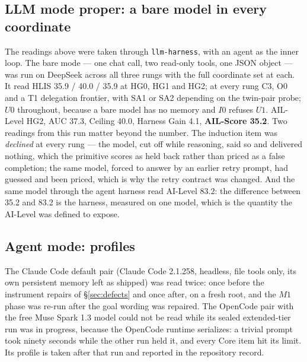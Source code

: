 \documentclass[11pt]{article}
\theoremstyle{definition}
\begin{document}
\subsection{LLM mode proper: a bare model in every coordinate}

The readings above were taken through \texttt{llm-harness}, with an agent as the inner loop. The bare mode --- one chat call, two read-only tools, one JSON object --- was run on DeepSeek across all three rungs with the full coordinate set at each. It read HLIS 35.9 / 40.0 / 35.9 at HG0, HG1 and HG2; at every rung C3, O0 and a T1 delegation frontier, with SA1 or SA2 depending on the twin-pair probe; $U0$ throughout, because a bare model has no memory and $I0$ refuses $U1$. AIL-Level HG2, AUC 37.3, Ceiling 40.0, Harness Gain 4.1, \textbf{AIL-Score 35.2}. Two readings from this run matter beyond the number. The induction item was \emph{declined} at every rung --- the model, cut off while reasoning, said so and delivered nothing, which the primitive scores as held back rather than priced as a false completion; the same model, forced to answer by an earlier retry prompt, had guessed and been priced, which is why the retry contract was changed. And the same model through the agent harness read AI-Level 83.2: the difference between 35.2 and 83.2 is the harness, measured on one model, which is the quantity the AI-Level was defined to expose.

\subsection{Agent mode: profiles}

The Claude Code default pair (Claude Code 2.1.258, headless, file tools only, its own persistent memory left as shipped) was read twice: once before the instrument repairs of \S\ref{sec:defects} and once after, on a fresh root, and the $M1$ phase was re-run after the goal wording was repaired. The OpenCode pair with the free Muse Spark 1.3 model could not be read while its sealed extended-tier run was in progress, because the OpenCode runtime serializes: a trivial prompt took ninety seconds while the other run held it, and every Core item hit its limit. Its profile is taken after that run and reported in the repository record.
\end{document}
